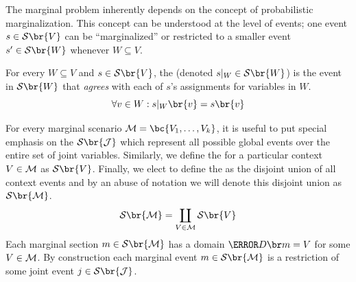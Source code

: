 \documentclass[aps, 10pt, english, twoside, pra, nofootinbib, tightenlines, longbibliography]{revtex4-1}
\renewcommand{\Events}[1]{\mathcal{S}\br{#1}} %
\begin{document}
    The marginal problem inherently depends on the concept of probabilistic marginalization. This concept can be understood at the level of events; one event $s \in \Events{V}$ can be ``marginalized'' or restricted to a smaller event $s' \in \Events{W}$ whenever $W \subseteq V$.
    \begin{definition}
    \label{def:section_restriction}
    For every $W \subseteq V$ and $s \in \Events{V}$, the  (denoted $s|_{W} \in \Events{W}$) is the event in $\Events{W}$ that \textit{agrees} with each of $s$'s assignments for variables in $W$.
    \[ \forall v \in W : s|_{W}\br{v} = s\br{v} \]
    \end{definition}


    For every marginal scenario $\mscenario = \bc{V_1, \ldots, V_k}$, it is useful to put special emphasis on the  $\Events{\jointvar}$ which represent all possible global events over the entire set of joint variables. Similarly, we define the  for a particular context $V \in \mathcal{M}$ as $\Events{V}$. Finally, we elect to define the  as the disjoint union of all context events and by an abuse of notation we will denote this disjoint union as $\Events{\mscenario}$.
    \[ \Events{\mscenario} = \coprod_{V \in \mscenario} \Events{V} \]
    Each marginal section $m \in \Events{\mscenario}$ has a domain $\Dom{m} = V$ for some $V \in \mathcal{M}$. By construction each marginal event $m \in \Events{\mscenario}$ is a restriction of some joint event $j \in \Events{\jointvar}$.
\end{document}
